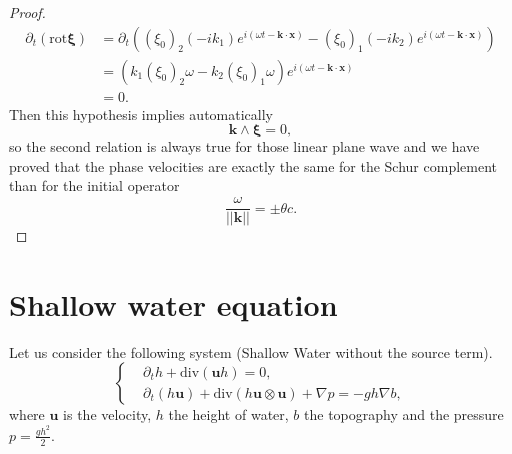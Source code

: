 \documentclass[a4paper, 11pt]{report}
\begin{document}
\begin{proof}
\begin{equation*}
\begin{split}
\partial_t(\boldsymbol{\mathrm{rot}}\boldsymbol{\xi})&=\partial_t \left(\left(\xi_0\right)_2(-ik_1)e^{i(\omega t-\boldsymbol{k}\cdot \boldsymbol{x})}-\left(\xi_0\right)_1(-ik_2)e^{i(\omega t-\boldsymbol{k}\cdot \boldsymbol{x})} \right)\\
&=(k_1\left(\xi_0\right)_2\omega -k_2\left(\xi_0\right)_1\omega)e^{i(\omega t-\boldsymbol{k}\cdot \boldsymbol{x})}\\
&=0.
\end{split}
\end{equation*}
Then this hypothesis implies automatically \begin{equation*}
\boldsymbol{k}\wedge\boldsymbol{\xi}=0,
\end{equation*}
so the second relation is always true for those linear plane wave and we have proved that the phase velocities are exactly the same for the Schur complement than for the initial operator
\begin{equation*}
\frac{\omega}{||\boldsymbol{k}||}=\pm \theta c.
\end{equation*}
\end{proof}


 



\chapter{Shallow water equation}
Let us consider the following system (Shallow Water without the source term).
\begin{equation*}
\left\{
\begin{split}
&\partial_t h+\text{div}\left(\boldsymbol{u}h\right)=0,\\
&\partial_t \left(h\boldsymbol{u}\right)+\text{div}\left(h\boldsymbol{u}\otimes \boldsymbol{u}\right)+\nabla p=-gh\nabla b,
\end{split}
\right.
\end{equation*}
where $\boldsymbol{u}$ is the velocity, $h$ the height of water, $b$ the topography and the pressure $p=\frac{gh^2}{2}.$\\
\end{document}
